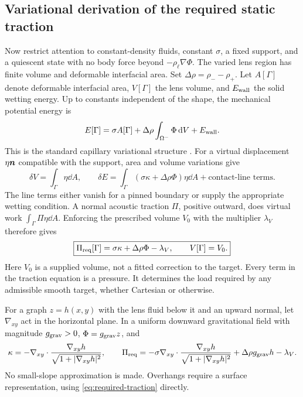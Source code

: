 \subsection{Variational derivation of the required static traction}
Now restrict attention to constant-density fluids, constant $\sigma$, a fixed
support, and a quiescent state with no body force beyond $-\rho_\ell\nabla\Phi$.
The varied lens region has finite volume and deformable interfacial area. Set
$\Delta\rho=\rho_- -\rho_+$. Let $A[\Gamma]$ denote deformable interfacial area,
$V[\Gamma]$ the lens volume, and $E_{\rm wall}$ the solid wetting energy. Up to
constants independent of the shape, the mechanical potential energy is
\begin{equation}
 E[\Gamma]=\sigma A[\Gamma]
     +\Delta\rho\int_{\Omega^-}\Phi\,\mathrm d V+E_{\rm wall}.
 \label{eq:capillary-energy}
\end{equation}
This is the standard capillary variational structure \cite{finn1986}. For a
virtual displacement $\eta\bm n$ compatible with the support, area and volume
variations give
\begin{equation}
 \delta V=\int_\Gamma\eta\dd A,\qquad
 \delta E=\int_\Gamma(\sigma\kappa+\Delta\rho\Phi)\eta\dd A
                +\text{contact-line terms}.
 \label{eq:first-variation}
\end{equation}
The line terms either vanish for a pinned boundary or supply the appropriate
wetting condition. A normal acoustic traction $\Pi$, positive outward, does
virtual work $\int_\Gamma\Pi\eta\dd A$. Enforcing the prescribed volume
$V_0$ with the multiplier $\lambda_V$ therefore gives
\begin{equation}
 \boxed{\Pi_{\rm req}[\Gamma]
       =\sigma\kappa+\Delta\rho\Phi-\lambda_V,
       \qquad V[\Gamma]=V_0.}
 \label{eq:required-traction}
\end{equation}
Here $V_0$ is a supplied volume, not a fitted correction to the target. Every
term in the traction equation is a pressure. It determines the load required
by any admissible smooth target, whether Cartesian or otherwise.

For a graph $z=h(x,y)$ with the lens fluid below it and an upward normal, let
$\nabla_{xy}$ act in the horizontal plane. In a uniform downward gravitational
field with magnitude $g_{\rm grav}>0$, $\Phi=g_{\rm grav}z$, and
\begin{equation}
 \kappa=-\nabla_{xy}\cdot
       \frac{\nabla_{xy}h}{\sqrt{1+|\nabla_{xy}h|^2}},\qquad
 \Pi_{\rm req}=-\sigma\nabla_{xy}\cdot
       \frac{\nabla_{xy}h}{\sqrt{1+|\nabla_{xy}h|^2}}
       +\Delta\rho g_{\rm grav}h-\lambda_V.
 \label{eq:graph-traction}
\end{equation}
No small-slope approximation is made. Overhangs require a surface
representation, using \cref{eq:required-traction} directly.

